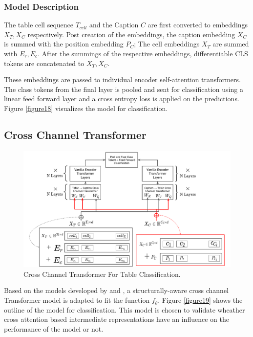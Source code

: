 \subsubsection{Model Description}
The table cell sequence $T_{cell}$ and the Caption $C$ are first converted to embeddings $X_T, X_C$ respectively. Post creation of the embeddings, the caption embedding  $X_C$ is summed with the position embedding $P_C$; The cell embeddings $X_T$ are summed with $E_r,E_c$. After the summings of the respective embeddings,  differentiable CLS tokens are concatenated to $X_T,X_C$.

These embeddings are passed to individual encoder self-attention transformers. The class tokens from the final layer is pooled and sent for classification using a linear feed forward layer and a cross entropy loss is applied on the predictions. Figure \ref{figure18} visualizes the model for classification. 


\subsection{Cross Channel Transformer}
\label{table_classification:models:cross-channel}
\begin{figure}[h]
    \centering
    \includegraphics[width=\maxwidth{\textwidth}]{src/images/Pic-Export-CC-Trans-Thesis.pdf}
    \caption{Cross Channel Transformer For Table Classification. }
    \label{figure\arabic{figurecounter}}
\end{figure}

Based on the models developed by \cite{tsai2019multimodal} and \cite{deng2020turl}, a structurally-aware cross channel Transformer model is adapted to fit the function $f_\theta$. Figure \ref{figure19} shows the outline of the model for classification. This model is chosen to validate wheather cross attention based intermediate representations have an influence on the performance of the model or not. 
